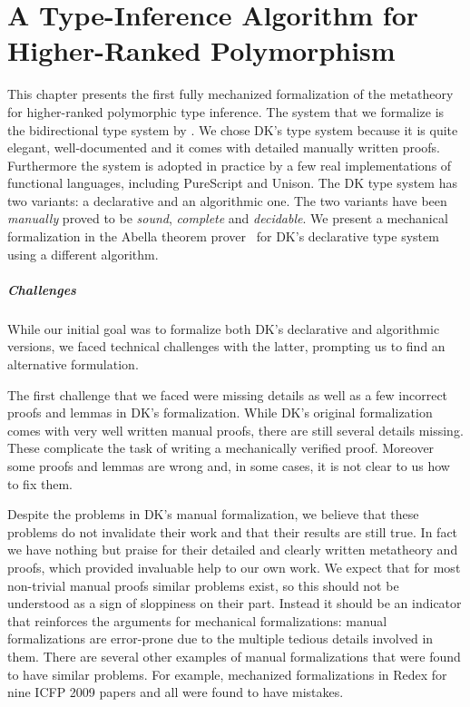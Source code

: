 \chapter{A Type-Inference Algorithm for Higher-Ranked Polymorphism}
\label{chap:ICFP}

This chapter presents the first fully mechanized formalization of the
metatheory for higher-ranked polymorphic type inference.
The system that we formalize
is the bidirectional type system by \citet{dunfield2013complete}.
We chose DK's type system because it is
quite elegant, well-documented and it comes with detailed manually
written proofs. Furthermore the system is adopted in practice by a few
real implementations of functional languages, including PureScript and
Unison. The DK type system has two variants: a declarative
and an algorithmic one. The two variants have been
\emph{manually} proved to be \emph{sound}, \emph{complete} and
\emph{decidable}.
We present a mechanical formalization in the Abella theorem prover~\citep{AbellaDesc} for
DK's declarative type system using a different algorithm.

\paragraph{Challenges}
While our initial goal was to formalize both DK's declarative and algorithmic
versions, we faced technical challenges with the latter, prompting us to find
an alternative formulation.

The first challenge that we faced were missing details as well as
a few incorrect proofs and lemmas in DK's formalization. While DK's
original formalization comes with very well written manual proofs,
there are still several details missing. These complicate the task of
writing a mechanically verified proof. Moreover some proofs and
lemmas are wrong and, in some cases, it is not clear to us how to fix them.

Despite the problems in DK's manual formalization,
we believe that these problems do not
invalidate their work and that their results are still true.
In fact we have nothing but praise for their detailed
and clearly written metatheory and proofs, which provided invaluable
help to our own work.
We expect that for most non-trivial manual
proofs similar problems exist, so this should not be understood as a sign of sloppiness
on their part. Instead it should be an indicator that reinforces the arguments
for mechanical formalizations: manual formalizations are error-prone due to the multiple
tedious details involved in them.
There are several other examples of manual formalizations that were found to have
similar problems. For example, \citet{KleinRunYourResearch}
mechanized formalizations
in Redex for nine ICFP 2009 papers and all were found to have mistakes.

